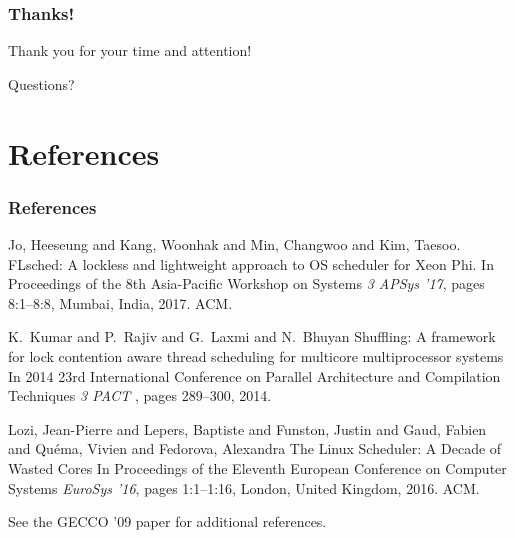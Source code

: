 \documentclass{beamer}
\newcommand{\linespace}{\vskip 0.25cm}
\begin{document}
\begin{frame}
\frametitle{Thanks!}

Thank you for your time and attention!

\begin{center}
{\huge Questions?}
\end{center}
\end{frame}

\section*{References}

\begin{frame} 
\frametitle{References} 

\begin{thebibliography}{lskdjf}

Jo, Heeseung and Kang, Woonhak and Min, Changwoo and Kim, Taesoo.
\newblock FLsched: A lockless and lightweight approach to OS scheduler for Xeon Phi.
\newblock In Proceedings of the 8th Asia-Pacific Workshop on Systems {\em3 APSys '17}, pages 8:1--8:8, Mumbai, India, 2017. ACM.

K.~Kumar and P.~Rajiv and G.~Laxmi and N.~Bhuyan
\newblock Shuffling: A framework for lock contention aware thread scheduling for multicore multiprocessor systems
\newblock In 2014 23rd International Conference on Parallel Architecture and Compilation Techniques {\em3 PACT }, pages 289--300, 2014.

Lozi, Jean-Pierre and Lepers, Baptiste and Funston, Justin and Gaud, Fabien and Qu{\'e}ma, Vivien and Fedorova, Alexandra
\newblock The {Linux} Scheduler: A Decade of Wasted Cores
\newblock In Proceedings of the Eleventh European Conference on Computer Systems {\em EuroSys '16}, pages 1:1--1:16, London, United Kingdom, 2016. ACM.

  
\end{thebibliography}

\linespace
\begin{center}
	See the GECCO '09 paper for additional references.
	\end{center}
\end{frame} 
\end{document}

